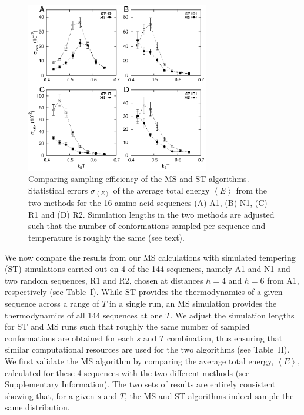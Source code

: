 \documentclass[
aip,
rsi,%
amsmath,amssymb,
reprint,%
]{revtex4-1}
\newcommand	 {\sbar}	{{s}}
\begin{document}
\begin{figure}
\includegraphics[width=8.0cm]{Fig4}
\caption{Comparing sampling efficiency of the MS and ST algorithms. Statistical errors $\sigma_{\left < E\right >}$ of the average total energy $\left < E\right >$ from the two methods for the 16-amino acid sequences (A) A1, (B) N1, (C) R1 and (D) R2. Simulation lengths in the two methods are adjusted such that the number of conformations sampled per sequence and temperature is roughly the same (see text). }
\end{figure}

We now compare the results from our MS calculations with simulated tempering (ST) simulations carried out on 4 of the 144 sequences, namely A1 and N1 and two random sequences, R1 and R2, chosen at distances $h=4$ and $h=6$ from A1, respectively (see Table~I). While ST provides the thermodynamics of a given sequence across a range of $T$ in a single run, an MS simulation provides the thermodynamics of all 144 sequences at one $T$. We adjust the simulation lengths for ST and MS runs such that roughly the same number of sampled conformations are obtained for each $\sbar$ and $T$ combination, thus ensuring that similar computational resources are used for the two algorithms (see Table~II). We first validate the MS algorithm by comparing the average total energy, $\left < E \right >$, calculated for these 4 sequences with the two different methods (see Supplementary Information). The two sets of results are entirely consistent showing that, for a given $\sbar$ and $T$, the MS and ST algorithms indeed sample the same distribution. 
\end{document}
